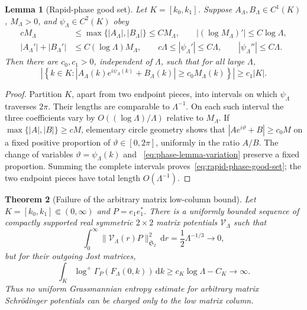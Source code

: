 \documentclass[11pt]{article}
\newcommand{\HS}{\mathfrak S_2}
\newcommand{\dd}{\,\mathrm d}
\newtheorem{theorem}{Theorem}[section]
\newtheorem{lemma}[theorem]{Lemma}
\theoremstyle{definition}
\theoremstyle{remark}
\begin{document}
\begin{lemma}[Rapid-phase good set]\label{lem:rapid-phase-good-set}
Let $K=[k_0,k_1]$.  Suppose $A_\Lambda,B_\Lambda\in C^1(K)$,
$M_\Lambda>0$, and $\psi_\Lambda\in C^2(K)$ obey
\begin{align}
 cM_\Lambda&\leq\max\{|A_\Lambda|,|B_\Lambda|\}
 \leq CM_\Lambda,\qquad
 |(\log M_\Lambda)'|\leq C\log\Lambda, \label{eq:phase-lemma-size}\\
 |A_\Lambda'|+|B_\Lambda'|&\leq
 C(\log\Lambda)M_\Lambda,\qquad
 c\Lambda\leq|\psi_\Lambda'|\leq C\Lambda,\qquad
 |\psi_\Lambda''|\leq C\Lambda. \label{eq:phase-lemma-variation}
\end{align}
Then there are $c_0,c_1>0$, independent of $\Lambda$, such that for all large
$\Lambda$,
\begin{equation}
 \left|\left\{k\in K:
 |A_\Lambda(k)e^{i\psi_\Lambda(k)}+B_\Lambda(k)|
 \geq c_0M_\Lambda(k)\right\}\right|
 \geq c_1|K|.
 \label{eq:rapid-phase-good-set}
\end{equation}
\end{lemma}

\begin{proof}
Partition $K$, apart from two endpoint pieces, into intervals on which
$\psi_\Lambda$ traverses $2\pi$.  Their lengths are comparable to
$\Lambda^{-1}$.  On each such interval the three coefficients vary by
$O((\log\Lambda)/\Lambda)$ relative to $M_\Lambda$.  If
$\max\{|A|,|B|\}\geq cM$, elementary circle geometry shows that
$|Ae^{i\vartheta}+B|\geq c_0M$ on a fixed positive proportion of
$\vartheta\in[0,2\pi]$, uniformly in the ratio $A/B$.  The change of variables
$\vartheta=\psi_\Lambda(k)$ and
~\eqref{eq:phase-lemma-variation} preserve a fixed proportion.  Summing the
complete intervals proves~\eqref{eq:rapid-phase-good-set}; the two endpoint
pieces have total length $O(\Lambda^{-1})$.
\end{proof}

\begin{theorem}[Failure of the arbitrary matrix low-column bound]
\label{thm:matrix-rotator-counterexample}
Let $K=[k_0,k_1]\Subset(0,\infty)$ and $P=e_1e_1^*$.  There is a uniformly
bounded sequence of compactly supported real symmetric $2\times2$ matrix
potentials $\mathcal V_\Lambda$ such that
\begin{equation}
 \int_0^\infty\|\mathcal V_\Lambda(r)P\|_{\HS}^2\dd r
 =\frac12\Lambda^{-1/3}\longrightarrow0,
 \label{eq:matrix-rotator-total-cost}
\end{equation}
but for their outgoing Jost matrices,
\begin{equation}
 \int_K\log^+\Gamma_P(F_\Lambda(0,k))\dd k
 \geq c_K\log\Lambda-C_K\longrightarrow\infty.
 \label{eq:matrix-rotator-entropy-growth}
\end{equation}
Thus no uniform Grassmannian entropy estimate for arbitrary matrix
Schr\"odinger potentials can be charged only to the low matrix column.
\end{theorem}
\end{document}
